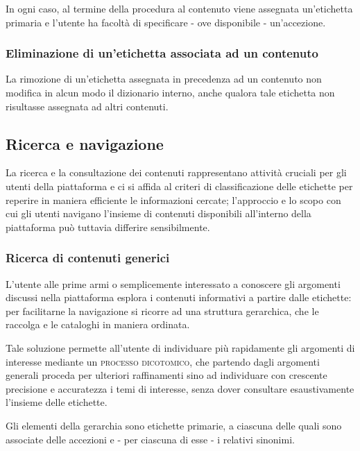 \documentclass[10pt,a4paper,headinclude,footinclude,hidelinks]{scrreprt} %
\begin{document}
	In ogni caso, al termine della procedura al contenuto viene assegnata un'etichetta primaria e l'utente ha facoltà di specificare - ove disponibile - un'accezione.
	\subsubsection{Eliminazione di un'etichetta associata ad un contenuto}
	La rimozione di un'etichetta assegnata in precedenza ad un contenuto non modifica in alcun modo il dizionario interno, anche qualora tale etichetta non risultasse assegnata ad altri contenuti.

	\subsection{Ricerca e navigazione}
	La ricerca e la consultazione dei contenuti rappresentano attività cruciali per gli utenti della piattaforma e ci si affida al criteri di classificazione delle etichette per reperire in maniera efficiente le informazioni cercate; l'approccio e lo scopo con cui gli utenti navigano l'insieme di contenuti disponibili all'interno della piattaforma può tuttavia differire sensibilmente.

	\subsubsection{Ricerca di contenuti generici}
	L'utente alle prime armi o semplicemente interessato a conoscere gli argomenti discussi nella piattaforma esplora i contenuti informativi a partire dalle etichette: per facilitarne la navigazione si ricorre ad una struttura gerarchica, che le raccolga e le cataloghi in maniera ordinata.

	Tale soluzione permette all'utente di individuare più rapidamente gli argomenti di interesse mediante un \textsc{processo dicotomico}, che partendo dagli argomenti generali proceda per ulteriori raffinamenti sino ad individuare con crescente precisione e accuratezza i temi di interesse, senza dover consultare esaustivamente l'insieme delle etichette.

	Gli elementi della gerarchia sono etichette primarie, a ciascuna delle quali sono associate delle accezioni e - per ciascuna di esse - i relativi sinonimi. 
	
\end{document}
